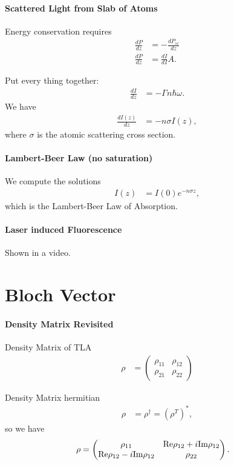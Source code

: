 \documentclass[../../note.tex]{subfiles}
\begin{document}
\paragraph{Scattered Light from Slab of Atoms}
Energy conservation requires
\begin{align}
    \frac{d P}{d z}
    &= - \frac{d P_{sc}}{d z} \\
    \frac{d P}{d z}
    &= \frac{d I}{d I} A.
\end{align}

Put every thing together:
\begin{align}
    \frac{d I}{d z}
    &= -\Gamma n \hbar \omega.
\end{align}
We have
\begin{align}
    \frac{d I(z)}{d z}
    &= - n \sigma I(z),
\end{align}
where $\sigma$ is the atomic scattering cross section.

\paragraph{Lambert-Beer Law (no saturation)}
We compute the solutions
\begin{align}
    I(z)
    &= I(0)e^{-n \sigma z},
\end{align}
which is the Lambert-Beer Law of Absorption.

\paragraph{Laser induced Fluorescence}
Shown in a video.

\section{Bloch Vector}
\paragraph{Density Matrix Revisited}
Density Matrix of TLA
\begin{align}
    \rho
    &= \left(\begin{matrix}
        \rho_{11} & \rho_{12} \\
        \rho_{21} & \rho_{22}
    \end{matrix}\right)
\end{align}

Density Matrix hermitian
\begin{align}
    \rho
    &= \rho^\dagger = (\rho^T)^\ast,
\end{align}
so we have
\begin{align}
    \rho
    &= \left(\begin{matrix}
        \rho_{11} & {\rm Re}\rho_{12} + i {\rm Im}\rho_{12} \\
        {\rm Re}\rho_{12} - i {\rm Im}\rho_{12} & \rho_{22}
    \end{matrix}\right).
\end{align}
\end{document}
